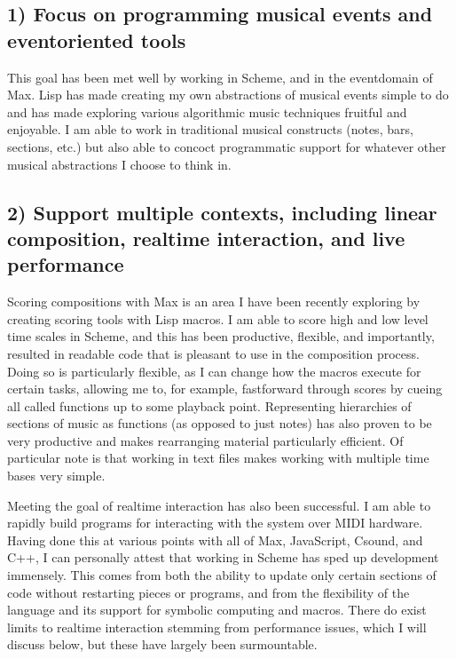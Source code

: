 \documentclass[letterpaper,10pt,english]{sphinxmanual}
\begin{document}
\subsection{1) Focus on programming musical events and event\sphinxhyphen{}oriented tools}
\label{\detokenize{conclusion:focus-on-programming-musical-events-and-event-oriented-tools}}
\sphinxAtStartPar
This goal has been met well by working in Scheme, and in the event\sphinxhyphen{}domain of Max.
Lisp has made creating my own abstractions of musical events simple to do and has made
exploring various algorithmic music techniques fruitful and enjoyable.
I am able to work in traditional musical constructs (notes, bars, sections, etc.)
but also able to concoct programmatic support for whatever other musical abstractions I choose to think in.


\subsection{2) Support multiple contexts, including linear composition, real\sphinxhyphen{}time interaction, and live performance}
\label{\detokenize{conclusion:support-multiple-contexts-including-linear-composition-real-time-interaction-and-live-performance}}
\sphinxAtStartPar
Scoring compositions with Max is an area I have been recently exploring by creating
scoring tools with Lisp macros.
I am able to score high and low level time scales in Scheme, and this has been productive,
flexible, and importantly, resulted in readable code that is pleasant to use in the composition process.
Doing so is particularly flexible, as I can change how the macros
execute for certain tasks, allowing me to, for example, fast\sphinxhyphen{}forward through scores by
cueing all called functions up to some playback point.
Representing hierarchies of sections of music as functions (as opposed to just notes)
has also proven to be very productive and makes rearranging material particularly efficient.
Of particular note is that working in text files makes working with multiple time bases very simple.

\sphinxAtStartPar
Meeting the goal of realtime interaction has also been successful.
I am able to rapidly build programs for interacting with the system over MIDI hardware.
Having done this at various points with all of Max, JavaScript, Csound, and C++, I
can personally attest that working in Scheme has sped up development immensely.
This comes from both the ability to update only certain sections of code without restarting
pieces or programs, and from the flexibility of the language and its support for symbolic
computing and macros. There do exist limits to realtime interaction stemming from performance
issues, which I will discuss below, but these have largely been surmountable.
\end{document}
